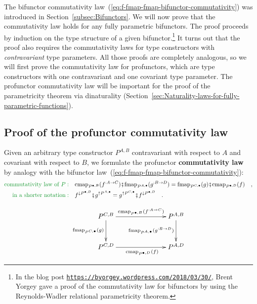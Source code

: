 The bifunctor commutativity law~(\ref{eq:f-fmap-fmap-bifunctor-commutativity})
was introduced in Section~\ref{subsec:Bifunctors}. We will now prove
that the commutativity law holds for any fully parametric bifunctors.
The proof proceeds by induction on the type structure of a given bifunctor.\footnote{In the blog post \texttt{\href{https://byorgey.wordpress.com/2018/03/30/}{https://byorgey.wordpress.com/2018/03/30/}},
Brent Yorgey gave a proof of the commutativity
law for bifunctors by using the Reynolds-Wadler relational parametricity
theorem. } It turns out that the proof also requires the commutativity laws
for type constructors with \emph{contravariant} type parameters. All
those proofs are completely analogous, so we will first prove the
commutativity law for profunctors, which are type constructors with
one contravariant and one covariant type parameter. The profunctor
commutativity law will be important for the proof of the parametricity
theorem via dinaturality (Section~\ref{sec:Naturality-laws-for-fully-parametric-functions}). 

\subsection{Proof of the profunctor commutativity law\label{subsec:Proof-of-the-profunctor-commutativity-law}}

Given an arbitrary type constructor $P^{A,B}$ contravariant with
respect to $A$ and covariant with respect to $B$, we formulate the
profunctor \textbf{commutativity law}
by analogy with the bifunctor law~(\ref{eq:f-fmap-fmap-bifunctor-commutativity}):
\begin{align}
{\color{greenunder}\text{commutativity law of }P:}\quad & \text{cmap}_{P^{\bullet,B}}(f^{:A\rightarrow C})\bef\text{fmap}_{P^{A,\bullet}}(g^{:B\rightarrow D})=\text{fmap}_{P^{C,\bullet}}(g)\bef\text{cmap}_{P^{\bullet,D}}(f)\quad,\nonumber \\
{\color{greenunder}\text{in a shorter notation}:}\quad & f^{\downarrow P^{\bullet,B}}\bef g^{\uparrow P^{A,\bullet}}=g^{\uparrow P^{C,\bullet}}\bef f^{\downarrow P^{\bullet,D}}\quad.\label{eq:profunctor-commutativity-law}
\end{align}

\begin{wrapfigure}{l}{0.38\columnwidth}%
\vspace{-1.7\baselineskip}
\[
\xymatrix{\xyScaleY{2.5pc}\xyScaleX{6.0pc}P^{C,B}\ar[r]\sp(0.55){\text{cmap}_{P^{\bullet,B}}(f^{:A\rightarrow C})~~~}\ar[d]\sb(0.45){\text{fmap}_{P^{C,\bullet}}(g)} & P^{A,B}\ar[d]\sb(0.45){\text{fmap}_{P^{A,\bullet}}(g^{:B\rightarrow D})}\\
P^{C,D}\ar[r]\sb(0.45){~~~~\text{cmap}_{P^{\bullet,D}}(f)} & P^{A,D}
}
\]

\vspace{-1.7\baselineskip}
\end{wrapfigure}%

